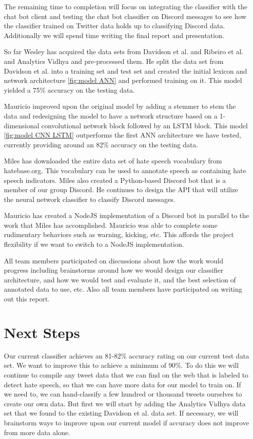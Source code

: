 \documentclass[conference]{sig-alternate-05-2015}
\begin{document}
The remaining time to completion will focus on integrating the classifier with the chat bot client and testing the chat bot classifier on Discord messages to see how the classifier trained on Twitter data holds up to classifying Discord data. Additionally we will spend time writing the final report and presentation.

So far Wesley has acquired the data sets from Davidson et al. and Ribeiro et al. and Analytics Vidhya and pre-processed them. He split the data set from Davidson et al. into a training set and test set and created the initial lexicon and network architecture \ref{fig:model ANN} and performed training on it. This model yielded a 75\% accuracy on the testing data.

Mauricio improved upon the original model by adding a stemmer to stem the data and redesigning the model to have a network structure based on a 1-dimensional convolutional network block followed by an LSTM block. This model \ref{fig:model CNN LSTM} outperforms the first ANN architecture we have tested, currently providing around an 82\% accuracy on the testing data.

Miles has downloaded the entire data set of hate speech vocabulary from hatebase.org.  This vocabulary can be used to annotate speech as containing hate speech indicators.  Miles also created a Python-based Discord bot that is a member of our group Discord. He continues to design the API that will utilize the neural network classifier to classify Discord messages.

Mauricio has created a NodeJS implementation of a Discord bot in parallel to the work that Miles has accomplished.  Mauricio was able to complete some rudimentary behaviors such as warning, kicking, etc.  This affords the project flexibility if we want to switch to a NodeJS implementation.

All team members participated on discussions about how the work would progress including brainstorms around how we would design our classifier architecture, and how we would test and evaluate it, and the best selection of annotated data to use, etc. Also all team members have participated on writing out this report. 


\section{Next Steps}

Our current classifier achieves an 81-82\% accuracy rating on our current test data set. We want to improve this to achieve a minimum of 90\%. To do this we will continue to compile any tweet data that we can find on the web that is labeled to detect hate speech, so that we can have more data for our model to train on. If we need to, we can hand-classify a few hundred or thousand tweets ourselves to create our own data. But first we will start by adding the Analytics Vidhya data set that we found to the existing Davidson et al. data set.
If necessary, we will brainstorm ways to improve upon our current model if accuracy does not improve from more data alone.
\end{document}
